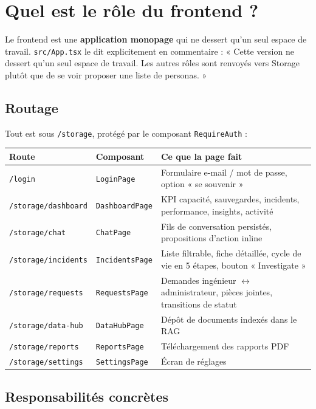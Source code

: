 \documentclass[11pt,a4paper]{report}
\newcommand{\file}[1]{\texttt{\small #1}}
\newcommand{\cls}[1]{\texttt{\small\textcolor{oasisblue}{#1}}}
\newcommand{\route}[1]{\texttt{\small\textcolor{oasisgreen}{#1}}}
\begin{document}
\section{Quel est le rôle du frontend ?}

Le frontend est une \textbf{application monopage} qui ne dessert qu'un seul
espace de travail. \file{src/App.tsx} le dit explicitement en commentaire :
« Cette version ne dessert qu'un seul espace de travail. Les autres rôles sont
renvoyés vers Storage plutôt que de se voir proposer une liste de personas. »

\subsection{Routage}

Tout est sous \route{/storage}, protégé par le composant \cls{RequireAuth} :

\begin{longtable}{@{}p{4.0cm}p{3.6cm}p{6.9cm}@{}}
\toprule
\textbf{Route} & \textbf{Composant} & \textbf{Ce que la page fait}\\
\midrule
\endhead
\route{/login} & \cls{LoginPage} & Formulaire e-mail / mot de passe, option « se souvenir »\\
\route{/storage/dashboard} & \cls{DashboardPage} & KPI capacité, sauvegardes, incidents, performance, insights, activité\\
\route{/storage/chat} & \cls{ChatPage} & Fils de conversation persistés, propositions d'action inline\\
\route{/storage/incidents} & \cls{IncidentsPage} & Liste filtrable, fiche détaillée, cycle de vie en 5 étapes, bouton « Investigate »\\
\route{/storage/requests} & \cls{RequestsPage} & Demandes ingénieur \(\leftrightarrow\) administrateur, pièces jointes, transitions de statut\\
\route{/storage/data-hub} & \cls{DataHubPage} & Dépôt de documents indexés dans le RAG\\
\route{/storage/reports} & \cls{ReportsPage} & Téléchargement des rapports PDF\\
\route{/storage/settings} & \cls{SettingsPage} & Écran de réglages\\
\bottomrule
\end{longtable}

\subsection{Responsabilités concrètes}
\end{document}
